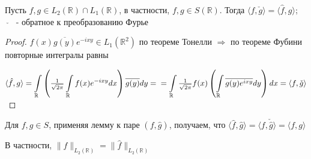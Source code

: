 \documentclass[a4paper,12pt]{report}
\begin{document}
\begin{lem}
Пусть $f,g\in L_2(\mathbb R)\cap L_1(\mathbb R)$, в частности, $f,g\in S(\mathbb R)$. Тогда $\langle f,\check g\rangle=\langle\hat f,g\rangle$; $\check\quad$ - обратное к преобразованию Фурье
\end{lem}
\begin{proof}
$f(x)\overline{g(y)}e^{-ixy}\in L_1(\mathbb R^2)$ по теореме Тонелли $\Rightarrow$ по теореме Фубини повторные интегралы равны

$\langle\hat f,g\rangle=\displaystyle\int\limits_{\mathbb R}\left(\textstyle\frac1{\sqrt{2\pi}}\displaystyle\int\limits_{\mathbb R}f(x)e^{-ixy}dx\right)\overline{g(y)}dy=\\=\displaystyle\int\limits_{\mathbb R}\textstyle\frac1{\sqrt{2\pi}}f(x)\left(\displaystyle\int\limits_{\mathbb R}\overline{g(y)e^{ixy}}dy\right)dx=\langle f,\check g\rangle$
\end{proof}


Для $f,g\in S$, применяя лемму к паре $(f,\hat g)$, получаем, что $\langle\hat f,\hat g\rangle=\langle f,\check{\hat g}\rangle=\langle f,g\rangle$

В частности, $\|f\|_{L_2(\mathbb R)}=\|\hat f\|_{L_2(\mathbb R)}$
\end{document}
